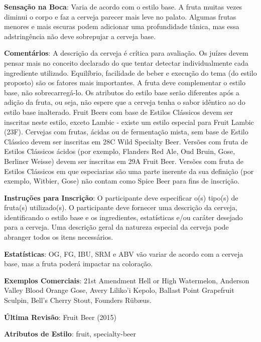 \textbf{Sensação na Boca}: Varia de acordo com o estilo base. A fruta muitas vezes diminui o corpo e faz a cerveja parecer mais leve no palato. Algumas frutas menores e mais escuras podem adicionar uma profundidade tânica, mas essa adstringência não deve sobrepujar a cerveja base.

\textbf{Comentários}: A descrição da cerveja é crítica para avaliação. Os juízes devem pensar mais no conceito declarado do que tentar detectar individualmente cada ingrediente utilizado. Equilíbrio, facilidade de beber e execução do tema (do estilo proposto) são os fatores mais importantes. A fruta deve complementar o estilo base, não sobrecarregá-lo. Os atributos do estilo base serão diferentes após a adição da fruta, ou seja, não espere que a cerveja tenha o sabor idêntico ao do estilo base inalterado. Fruit Beers com base de Estilos Clássicos devem ser inscritas neste estilo, exceto Lambic - existe um estilo especial para Fruit Lambic (23F). Cervejas com frutas, ácidas ou de fermentação mista, sem base de Estilo Clássico devem ser inscritas em 28C Wild Specialty Beer. Versões com fruta de Estilos Clássicos ácidos (por exemplo, Flanders Red Ale, Oud Bruin, Gose, Berliner Weisse) devem ser inscritas em 29A Fruit Beer. Versões com fruta de Estilos Clássicos em que especiarias são uma parte inerente da sua definição (por exemplo, Witbier, Gose) não contam como Spice Beer para fins de inscrição.

\textbf{Instruções para Inscrição}: O participante deve especificar o(s) tipo(s) de fruta(s) utilizado(s). O participante deve fornecer uma descrição da cerveja, identificando o estilo base e os ingredientes, estatísticas e/ou caráter desejado para a cerveja. Uma descrição geral da natureza especial da cerveja pode abranger todos os itens necessários.

\textbf{Estatísticas}: OG, FG, IBU, SRM e ABV vão variar de acordo com a cerveja base, mas a fruta poderá impactar na coloração.

\textbf{Exemplos Comerciais}: 21st Amendment Hell or High Watermelon, Anderson Valley Blood Orange Gose, Avery Liliko'i Kepolo, Ballast Point Grapefruit Sculpin, Bell's Cherry Stout, Founders Rübæus.

\textbf{Última Revisão}: Fruit Beer (2015)

\textbf{Atributos de Estilo}: fruit, specialty-beer
